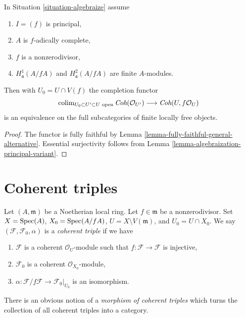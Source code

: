 \begin{lemma}
\label{lemma-equivalence}
In Situation \ref{situation-algebraize} assume
\begin{enumerate}
\item $I = (f)$ is principal,
\item $A$ is $f$-adically complete,
\item $f$ is a nonzerodivisor,
\item $H^1_\mathfrak a(A/fA)$ and $H^2_\mathfrak a(A/fA)$
are finite $A$-modules.
\end{enumerate}
Then with $U_0 = U \cap V(f)$ the completion functor
$$
\mathop{\mathrm{colim}}\nolimits_{U_0 \subset U' \subset U\text{ open}}
\textit{Coh}(\mathcal{O}_{U'})
\longrightarrow
\textit{Coh}(U, f\mathcal{O}_U)
$$
is an equivalence on the full subcategories of finite locally free objects.
\end{lemma}

\begin{proof}
The functor is fully faithful by
Lemma \ref{lemma-fully-faithful-general-alternative}.
Essential surjectivity follows from
Lemma \ref{lemma-algebraization-principal-variant}.
\end{proof}








\section{Coherent triples}
\label{section-coherent-triples}

\noindent
Let $(A, \mathfrak m)$ be a Noetherian local ring.
Let $f \in \mathfrak m$ be a nonzerodivisor. Set
$X = \mathop{\mathrm{Spec}}(A)$, $X_0 = \mathop{\mathrm{Spec}}(A/fA)$, $U = X \setminus V(\mathfrak m)$, and
$U_0 = U \cap X_0$.
We say $(\mathcal{F}, \mathcal{F}_0, \alpha)$ is a {\it coherent triple}
if we have
\begin{enumerate}
\item $\mathcal{F}$ is a coherent $\mathcal{O}_U$-module such that
$f : \mathcal{F} \to \mathcal{F}$ is injective,
\item $\mathcal{F}_0$ is a coherent $\mathcal{O}_{X_0}$-module,
\item $\alpha : \mathcal{F}/f\mathcal{F} \to \mathcal{F}_0|_{U_0}$
is an isomorphism.
\end{enumerate}
There is an obvious notion of a {\it morphism of coherent triples}
which turns the collection of all coherent triples into a category.

